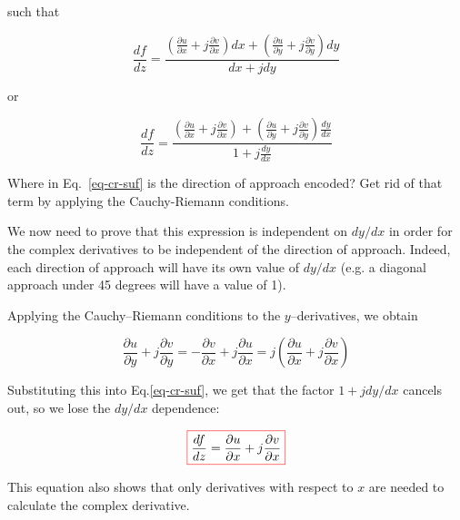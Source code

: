 such that

\begin{equation}
\frac{d f}{d z} = \frac{\left(\frac{\partial u}{\partial x}+j\frac{\partial v}{\partial x}\right) d x+\left(\frac{\partial u}{\partial y}+j\frac{\partial v}{\partial y}\right) d y}{d x + j d y}
\end{equation} 

or

\begin{equation}
\frac{d f}{d z} = \frac{\left(\frac{\partial u}{\partial x}+j\frac{\partial v}{\partial x}\right) +\left(\frac{\partial u}{\partial y}+j\frac{\partial v}{\partial y}\right) \frac{d y}{d x}}{1 + j \frac{d y}{d x}} \label{eq-cr-suf}
\end{equation} 

\begin{cue}
Where in Eq.~\ref{eq-cr-suf} is the direction of approach encoded? Get rid of that term by applying the Cauchy-Riemann conditions.
\end{cue}

We now need to prove that this expression is independent on $d y / d x$ in order for the complex derivatives to be independent of the direction of approach. Indeed, each direction of approach will have its own value of $d y / d x$ (e.g. a diagonal approach under 45 degrees will have a value of 1).

Applying the Cauchy--Riemann conditions to the $y$--derivatives, we obtain

\begin{equation}
\frac{\partial u}{\partial y}+j\frac{\partial v}{\partial y} = -\frac{\partial v}{\partial x}+j\frac{\partial u}{\partial x} = j \left( \frac{\partial u}{\partial x}+j\frac{\partial v}{\partial x} \right)
\end{equation}

Substituting this into Eq.\ref{eq-cr-suf}, we get that the factor $1 + j d y / d x$ cancels out, so we lose the  $d y / d x$ dependence:

\begin{equation}
\fbox{$\displaystyle
\frac{d f}{d z} = \frac{\partial u}{\partial x}+j\frac{\partial v}{\partial x}
$}
\end{equation} 

This equation also shows that only derivatives with respect to $x$ are needed to calculate the complex derivative.


